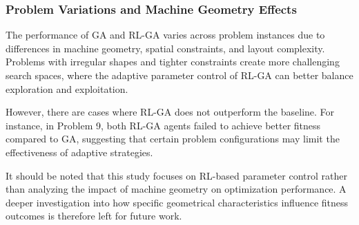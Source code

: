 \documentclass{article}
\begin{document}



\subsubsection{Problem Variations and Machine Geometry Effects}
The performance of GA and RL-GA varies across problem instances due to differences in machine geometry, spatial constraints, and layout complexity. Problems with irregular shapes and tighter constraints create more challenging search spaces, where the adaptive parameter control of RL-GA can better balance exploration and exploitation.

However, there are cases where RL-GA does not outperform the baseline. For instance, in Problem 9, both RL-GA agents failed to achieve better fitness compared to GA, suggesting that certain problem configurations may limit the effectiveness of adaptive strategies.

It should be noted that this study focuses on RL-based parameter control rather than analyzing the impact of machine geometry on optimization performance. A deeper investigation into how specific geometrical characteristics influence fitness outcomes is therefore left for future work.
\end{document}
